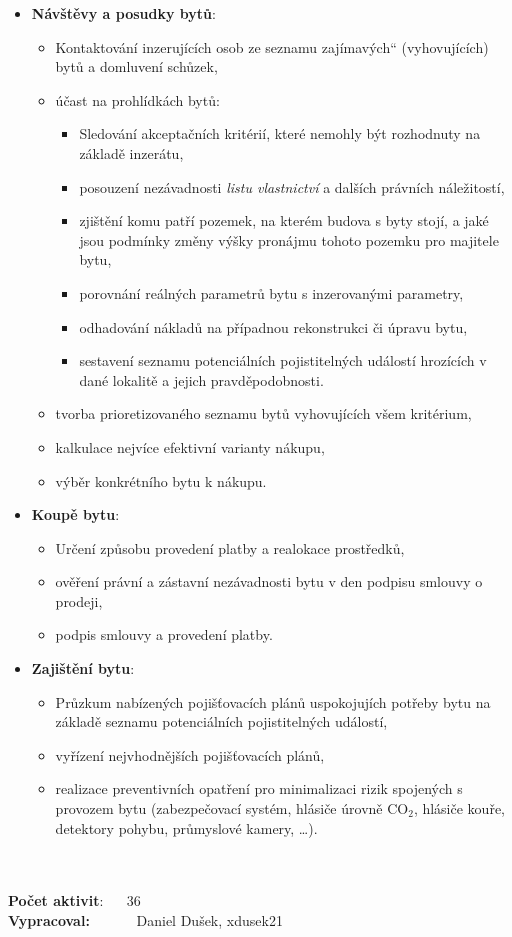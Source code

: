 \documentclass[a4paper,10pt]{article}
\providecommand{\uv}[1]{\quotedblbase #1\textquotedblleft}
\begin{document}
\begin{itemize}
	\item \textbf{Návštěvy a posudky bytů}:
		\begin{itemize}
			\item Kontaktování inzerujících osob ze seznamu \uv{zajímavých} (vyhovujících) bytů a domluvení schůzek,
			\item účast na prohlídkách bytů:
				\begin{itemize}
					\item Sledování akceptačních kritérií, které nemohly být rozhodnuty na základě inzerátu,
					\item posouzení nezávadnosti \textit{listu vlastnictví} a dalších právních náležitostí,
					\item zjištění komu patří pozemek, na kterém budova s byty stojí, a jaké jsou podmínky změny výšky pronájmu tohoto pozemku pro majitele bytu,
					\item porovnání reálných parametrů bytu s inzerovanými parametry,
					\item odhadování nákladů na případnou rekonstrukci či úpravu bytu,
					\item sestavení seznamu potenciálních pojistitelných událostí hrozících v dané lokalitě a jejich pravděpodobnosti.
				\end{itemize} 
			\item tvorba prioretizovaného seznamu bytů vyhovujících všem kritérium, 
			\item kalkulace nejvíce efektivní varianty nákupu,
			\item výběr konkrétního bytu k nákupu.
		\end{itemize}

	\item \textbf{Koupě bytu}:
		\begin{itemize}
			\item Určení způsobu provedení platby a realokace prostředků, 
			\item ověření právní a zástavní nezávadnosti bytu v den podpisu smlouvy o prodeji,
			\item podpis smlouvy a provedení platby. 
		\end{itemize}

	\item \textbf{Zajištění bytu}:
			\begin{itemize}
			\item Průzkum nabízených pojišťovacích plánů uspokojujích potřeby bytu na základě seznamu potenciálních pojistitelných událostí, 
			\item vyřízení nejvhodnějších pojišťovacích plánů,
			\item realizace preventivních opatření pro minimalizaci rizik spojených s provozem bytu (zabezpečovací systém, hlásiče úrovně CO$_2$, hlásiče kouře, detektory pohybu, průmyslové kamery, \dots{}).
		\end{itemize}
\end{itemize}

~\\
~\\
\textbf{Počet aktivit}: ~~ 36 \\
\textbf{Vypracoval:} ~~~~~~Daniel Dušek, xdusek21
\end{document}
